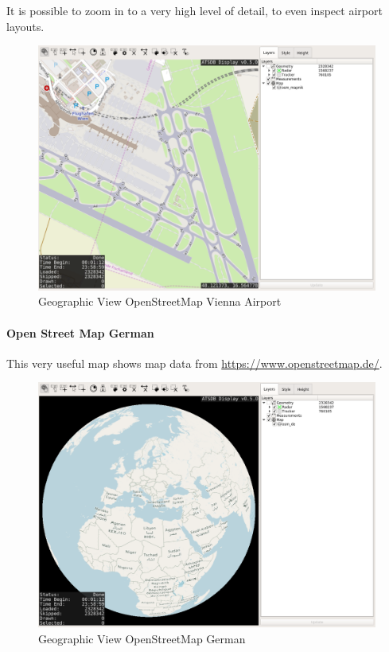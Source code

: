 It is possible to zoom in to a very high level of detail, to even inspect airport layouts.

\begin{figure}[H]
    \hspace*{-2.5cm}
    \includegraphics[width=19cm,frame]{figures/geoview_osm_vienna.png}
  \caption{Geographic View OpenStreetMap Vienna Airport}
\end{figure}

\newpage
\paragraph{Open Street Map German}

This very useful map shows map data from \url{https://www.openstreetmap.de/}.

\begin{figure}[H]
    \hspace*{-2.5cm}
    \includegraphics[width=19cm,frame]{figures/geoview_osm_de.png}
  \caption{Geographic View OpenStreetMap German}
\end{figure}


